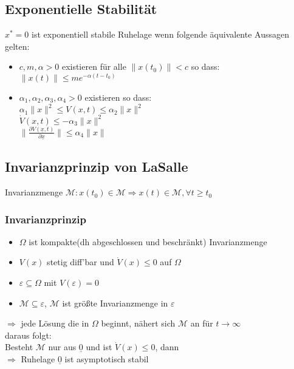 \documentclass[6pt,a4paper,fleqn]{scrartcl}
\begin{document}
\begin{multicols*}{4}
\subsection{Exponentielle Stabilität}
$x^* = 0$ ist exponentiell stabile Ruhelage wenn folgende äquivalente Aussagen gelten:
\begin{itemize}
  \item $c,m,\alpha > 0 $ existieren für alle $\|x(t_0)\| < c$ so dass: $\|x(t)\| \leq me^{-\alpha(t-t_0)}$
  \item $\alpha_1, \alpha_2, \alpha_3, \alpha_4 > 0$ existieren so dass:\\
    $\alpha_1 \|x\|^2 \leq V(x,t) \leq \alpha_2 \|x\|^2$ \\
    $\dot{V}(x,t) \leq - \alpha_3 \|x\|^2$ \\
    $\|\frac{\partial V(\underline{x},t)}{\partial \underline{x}}\| \leq \alpha_4 \|x\| $
\end{itemize}

\subsection{Invarianzprinzip von LaSalle}
Invarianzmenge $\mathcal{M}: x(t_0) \in \mathcal{M} \Rightarrow  x(t) \in \mathcal{M}, \forall t \geq t_0$

\subsubsection*{Invarianzprinzip}
\begin{itemize}
  \item $\Omega$ ist kompakte(dh abgeschlossen und beschränkt) Invarianzmenge
  \item $V(x)$ stetig diff'bar und $\dot{V}(x) \leq 0$ auf $\Omega$
  \item $\varepsilon \subseteq \Omega$ mit $V(\varepsilon) = 0$
  \item $\mathcal{M} \subseteq \varepsilon$, $\mathcal{M}$ ist größte Invarianzmenge in $\varepsilon$
\end{itemize}
$\Rightarrow$ jede Lösung die in $\Omega$ beginnt, nähert sich $\mathcal{M}$ an für $t \rightarrow \infty$ \\
daraus folgt: \\
Besteht $\mathcal{M}$ nur aus $\underline{0}$ und ist $\dot{V}(x) \leq 0$, dann \\
$\Rightarrow$ Ruhelage $\underline{0}$ ist asymptotisch stabil


\end{multicols*}
\end{document}
